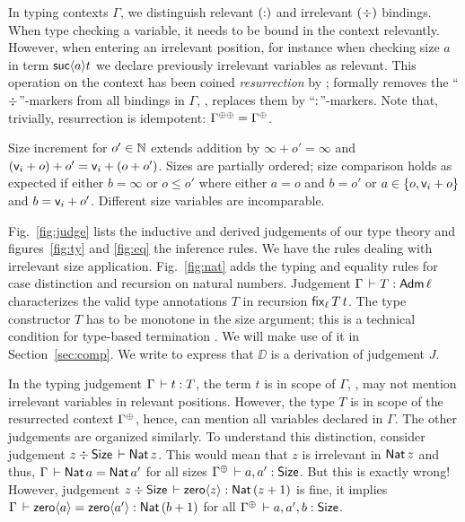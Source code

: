 \documentclass[acmsmall,screen]{acmart}\settopmatter{}
\begin{document}


In typing contexts $\Gamma$, we distinguish relevant $(\noterased)$ and irrelevant $(\erased)$ bindings.
When type checking a variable, it needs to be bound in the context relevantly.  However, when entering an irrelevant position, for instance when checking size $a$ in term $\suc a t$ we declare previously irrelevant variables as relevant.
This operation on the context has been coined
\emph{resurrection} by \citet{pfenning:lics01}; formally \fbox{$\resurrect\Gamma$} removes
the ``$\erased$''-markers from all bindings in $\Gamma$, \ie, replaces
them by ``$\noterased$''-markers.  Note that, trivially, resurrection is idempotent: $\resurrecttwice\Gamma = \resurrect{\Gamma}$.

Size increment  for $o' \in \NN$ extends addition by $\infty + o' = \infty$ and $(\ind i + o) + o' = \ind i + (o + o')$.  Sizes are partially ordered; size comparison  holds as expected if either $b = \infty$ or  $o \leq o'$ where either $a = o$ and $b = o'$ or $a \in \{ o, \ind i + o \}$ and $b = \ind i + o'$.
Different size variables are incomparable.





Fig.~\ref{fig:judge} lists the inductive and derived judgements of our type theory and
figures~\ref{fig:ty} and \ref{fig:eq} the inference rules.
We have  the rules dealing with irrelevant size application.
Fig.~\ref{fig:nat} adds the typing and equality rules for case distinction
and recursion on natural numbers.
Judgement $\Gamma \der T : \Adm \ell$ characterizes the valid type
annotations $T$ in recursion $\fix[\ell] T t$.  The type constructor $T$
has to be monotone in the size argument; this is a technical condition
for type-based termination \cite{gimenez:typeBased}.  We will make use
of it in Section~\ref{sec:comp}.
We write  to express that $\DD$ is a derivation of judgement $J$.

In the typing judgement $\Gamma \der t : T$, the term $t$ is in scope of
$\Gamma$, \ie, may not mention irrelevant variables in relevant
positions.  However, the type $T$ is in scope of the resurrected
context $\resurrect\Gamma$, hence, can mention all variables declared
in $\Gamma$.  The other judgements are organized similarly.  To
understand this distinction, consider judgement
$z \div \Size \der \Nat z$.  This would mean that $z$ is irrelevant in
$\Nat z$ and thus, $\Gamma \der \Nat a = \Nat {a'}$ for all sizes
$\resurrect\Gamma \der a,a' : \Size$.  But this is exactly wrong!  However,
judgement $z \div \Size \der \zero z : \Nat (z + 1)$ is fine, it
implies $\Gamma \der \zero a = \zero {a'} : \Nat (b+1)$ for all
$\resurrect\Gamma \der a,a',b : \Size$.
\end{document}
